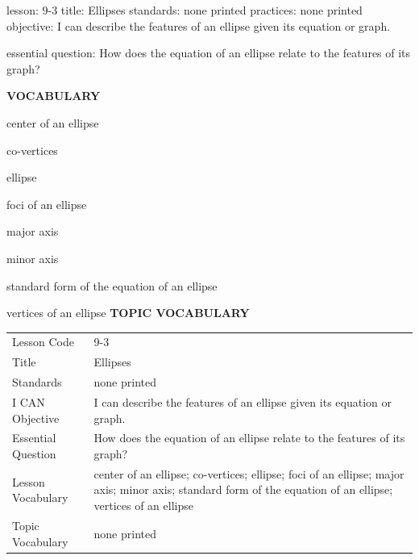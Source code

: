 \documentclass{article}
\newenvironment{lesson-meta}{}{}        %
\newcommand{\te}[1]{}                   %
\begin{document}
\begin{lesson-meta}
lesson: 9-3
title: Ellipses
standards: none printed
practices: none printed
objective: I can describe the features of an ellipse given its equation or graph.

essential question: How does the equation of an ellipse relate to the features of its graph?

\textbf{VOCABULARY}
\item center of an ellipse
\item co-vertices
\item ellipse
\item foci of an ellipse
\item major axis
\item minor axis
\item standard form of the equation of an ellipse
\item vertices of an ellipse
\textbf{TOPIC VOCABULARY}
\te{No topic vocabulary list is printed on these pages.}
\begin{tabular}{ll}
Lesson Code & 9-3 \\
Title & Ellipses \\
Standards & none printed \\
I CAN Objective & I can describe the features of an ellipse given its equation or graph. \\
Essential Question & How does the equation of an ellipse relate to the features of its graph? \\
Lesson Vocabulary & center of an ellipse; co-vertices; ellipse; foci of an ellipse; major axis; minor axis; standard form of the equation of an ellipse; vertices of an ellipse \\
Topic Vocabulary & none printed \\
\end{tabular}
\end{lesson-meta}
\end{document}

